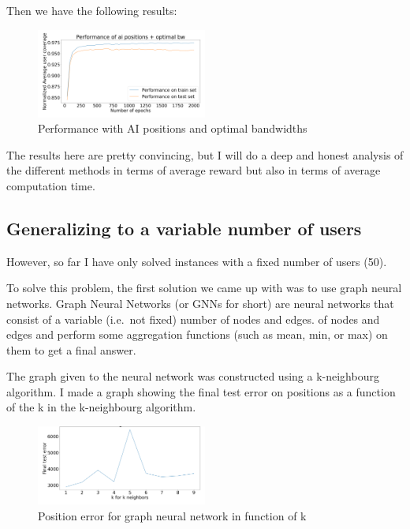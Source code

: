 \documentclass[letterpaper]{article}
\begin{document}
Then we have the following results:

\begin{figure}[H]
    \centering
    \includegraphics[width=0.5\textwidth]{images/mix_results.png}
    \caption{Performance with AI positions and optimal bandwidths}
\end{figure}

The results here are pretty convincing, but I will do a deep and honest analysis of the different methods in terms
of average reward but also in terms of average computation time.

\subsection{Generalizing to a variable number of users}

However, so far I have only solved instances with a fixed number of users (50).

To solve this problem, the first solution we came up with was to use graph neural networks.
Graph Neural Networks (or GNNs for short) are neural networks that consist of a variable (i.e.\, not fixed) number of nodes and edges.
of nodes and edges and perform some aggregation functions (such as mean, min, or max) on them to get a final answer.

The graph given to the neural network was constructed using a k-neighbourg algorithm.
I made a graph showing the final test error on positions as a function of the k in the k-neighbourg algorithm.

\begin{figure}[H]
    \centering
    \includegraphics[width=0.5\textwidth]{images/knn_for_gnn.png}
    \caption{Position error for graph neural network in function of k}
\end{figure}
\end{document}
